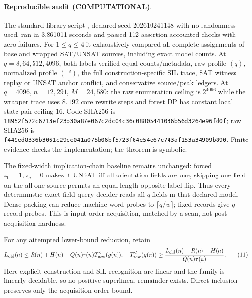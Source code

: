 \documentclass[11pt]{article}
\newcommand{\COMP}{\textbf{COMPUTATIONAL}}
\begin{document}
\paragraph{Reproducible audit (\COMP).}
The standard-library script , declared
seed 202610241148 with no randomness used, ran in 3.861011 seconds and passed
112 assertion-accounted checks with zero failures.  For $1\le q\le4$ it
exhaustively compared all complete assignments of base and wrapped SAT/UNSAT
sources, including exact model counts.  At $q=8,64,512,4096$, both labels
verified equal counts/metadata, raw profile $(q)$, normalized profile
$(1^q)$, the full construction-specific SIL trace, SAT witness replay or
UNSAT anchor conflict, and conservative source/peak ledgers.  At $q=4096$,
$n=12{,}291$, $M=24{,}580$: the raw enumeration ceiling is $2^{4096}$ while
the wrapper trace uses $8{,}192$ core rewrite steps and forest DP has constant
local state-pair ceiling 16.  Code SHA256 is
\texttt{18952f572c6713ef23b30a87e067c2dc04c36c08805441036b56d3264e96fd0f};
raw SHA256 is
\texttt{f449ed8336b3061c29cc041a075b06bf5723f64e54e67c743af153a34909b890}.
Finite evidence checks the implementation; the theorem is symbolic.

The fixed-width implication-chain baseline remains unchanged: forced
$z_0=1,z_q=0$ makes it UNSAT iff all orientation fields are one; skipping one
field on the all-one source permits an equal-length opposite-label flip.
Thus every deterministic exact field-query decider reads all $q$ fields in
that declared model.  Dense packing can reduce machine-word probes to
$\lceil q/w\rceil$; fixed records give $q$ record probes.  This is input-order
acquisition, matched by a scan, not post-acquisition hardness.

For any attempted lower-bound reduction, retain
\[
L_{\rm old}(n)\le R(n)+H(n)+Q(n)\tau(n)T_{\rm new}^{\le}(g(n)),
\quad
T_{\rm new}^{\le}(g(n))\ge
\frac{L_{\rm old}(n)-R(n)-H(n)}{Q(n)\tau(n)}.                        \tag{11}
\]
Here explicit construction and SIL recognition are linear and the family is
linearly decidable, so no positive superlinear remainder exists.  Direct
inclusion preserves only the acquisition-order bound.
\end{document}
